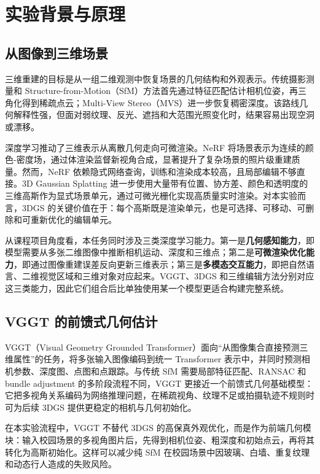 \documentclass[12pt, a4paper]{article}
\begin{document}
\section{实验背景与原理}

\subsection{从图像到三维场景}

三维重建的目标是从一组二维观测中恢复场景的几何结构和外观表示。传统摄影测量和 Structure-from-Motion（SfM）方法首先通过特征匹配估计相机位姿，再三角化得到稀疏点云；Multi-View Stereo（MVS）进一步恢复稠密深度。该路线几何解释性强，但面对弱纹理、反光、遮挡和大范围光照变化时，结果容易出现空洞或漂移。

深度学习推动了三维表示从离散几何走向可微渲染。NeRF 将场景表示为连续的颜色-密度场，通过体渲染监督新视角合成，显著提升了复杂场景的照片级重建质量。然而，NeRF 依赖隐式网络查询，训练和渲染成本较高，且局部编辑不够直接。3D Gaussian Splatting 进一步使用大量带有位置、协方差、颜色和透明度的三维高斯作为显式场景单元，通过可微光栅化实现高质量实时渲染。对本实验而言，3DGS 的关键价值在于：每个高斯既是渲染单元，也是可选择、可移动、可删除和可重新优化的编辑单元。

从课程项目角度看，本任务同时涉及三类深度学习能力。第一是\textbf{几何感知能力}，即模型需要从多张二维图像中推断相机运动、深度和三维点；第二是\textbf{可微渲染优化能力}，即通过图像重建误差反向更新三维表示；第三是\textbf{多模态交互能力}，即把自然语言、二维视觉区域和三维对象对应起来。VGGT、3DGS 和三维编辑方法分别对应这三类能力，因此它们组合后比单独使用某一个模型更适合构建完整系统。

\subsection{VGGT 的前馈式几何估计}

VGGT（Visual Geometry Grounded Transformer）面向“从图像集合直接预测三维属性”的任务，将多张输入图像编码到统一 Transformer 表示中，并同时预测相机参数、深度图、点图和点跟踪。与传统 SfM 需要局部特征匹配、RANSAC 和 bundle adjustment 的多阶段流程不同，VGGT 更接近一个前馈式几何基础模型：它把多视角关系编码为网络推理问题，在稀疏视角、纹理不足或拍摄轨迹不规则时可为后续 3DGS 提供更稳定的相机与几何初始化。

在本实验流程中，VGGT 不替代 3DGS 的高保真外观优化，而是作为前端几何模块：输入校园场景的多视角图片后，先得到相机位姿、粗深度和初始点云，再将其转化为高斯初始化。这样可以减少纯 SfM 在校园场景中因玻璃、白墙、重复纹理和动态行人造成的失败风险。
\end{document}

